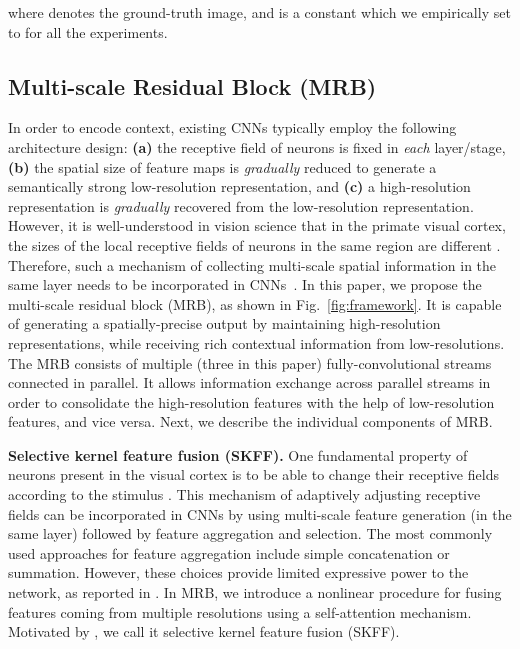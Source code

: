 \documentclass[runningheads]{llncs}
\begin{document}
where  denotes the ground-truth image, and  is a constant which we empirically set to  for all the experiments.



\subsection{Multi-scale Residual Block (MRB)}
\label{sec:msrb}
In order to encode context, existing CNNs \cite{ronneberger2015u,newell2016stacked,noh2015learning,xiao2018simple,badrinarayanan2017segnet,peng2016recurrent} typically employ the following architecture design: \textbf{(a)} the receptive field of neurons is fixed in \textit{each} layer/stage, \textbf{(b)} the spatial size of feature maps is \textit{gradually} reduced to generate a semantically strong low-resolution representation, and \textbf{(c)} a high-resolution representation is \textit{gradually} recovered from the low-resolution representation.  
However, it is well-understood in vision science that in the primate visual cortex, the sizes of the local receptive fields of neurons in the same region are different \cite{hubel1962receptive,riesenhuber1999hierarchical,serre2007robust,hung2005fast}. 
Therefore, such a mechanism of collecting multi-scale spatial information in the same layer needs to be incorporated in CNNs~\cite{huang2017multi,hrnet,fourure2017residual,Szegedy2015}.
In this paper, we propose the multi-scale residual block (MRB), as shown in Fig.~\ref{fig:framework}. 
It is capable of generating a spatially-precise output by maintaining high-resolution representations, while receiving rich contextual information from low-resolutions. 
The MRB consists of multiple (three in this paper) fully-convolutional streams connected in parallel. 
It allows information exchange across parallel streams in order to consolidate the high-resolution features with the help of low-resolution features, and vice versa. Next, we describe the individual components of MRB.




\vspace{0.4em} \noindent \textbf{Selective kernel feature fusion (SKFF).}
One fundamental property of neurons present in the visual cortex is to be able to change their receptive fields according to the stimulus \cite{li2019selective}. 
This mechanism of adaptively adjusting receptive fields can be incorporated in CNNs by using multi-scale feature generation (in the same layer) followed by feature aggregation and selection. 
The most commonly used approaches for feature aggregation include simple concatenation or summation. However, these choices provide limited expressive power to the network, as reported in \cite{li2019selective}.
In MRB, we introduce a nonlinear procedure for fusing features coming from multiple resolutions using a self-attention mechanism. Motivated by \cite{li2019selective}, we call it selective kernel feature fusion (SKFF). 
\end{document}
